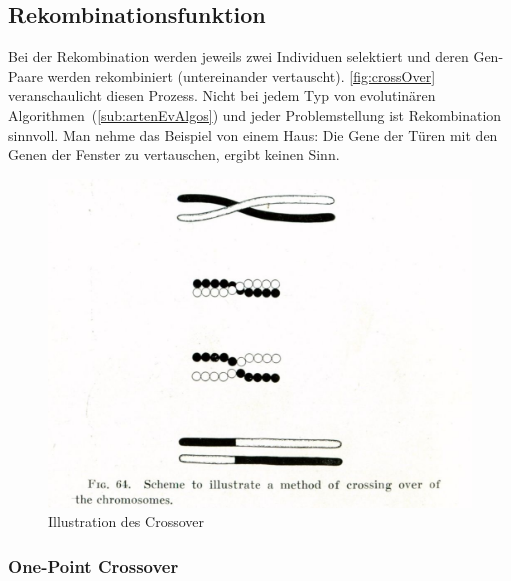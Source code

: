     \subsection{Rekombinationsfunktion}

        Bei der Rekombination werden jeweils zwei Individuen selektiert und
        deren Gen-Paare werden rekombiniert (untereinander vertauscht).
        \vref{fig:crossOver} veranschaulicht diesen Prozess.
        Nicht bei jedem Typ von evolutinären Algorithmen~(\vref{sub:artenEvAlgos}) und jeder Problemstellung ist Rekombination sinnvoll.
        Man nehme das Beispiel von einem Haus: Die Gene der Türen mit den Genen der Fenster zu vertauschen, ergibt keinen Sinn.

        \begin{figure}[H]
          \includegraphics[scale=0.3, center]{graphics/morgan_crossover}
          \caption{Illustration des Crossover \cite[]{WikipediaEN:crossOver} \label{fig:crossOver}}
        \end{figure}
        \subsubsection{One-Point Crossover}

